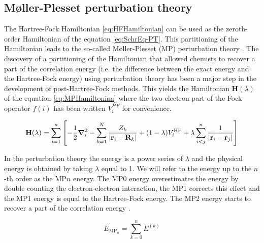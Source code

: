 \documentclass[11pt,a4paper]{article}
\newcommand{\bH}{\mathbf{H}}
\begin{document}
\subsection{M{\o}ller-Plesset perturbation theory}

The Hartree-Fock Hamiltonian \eqref{eq:HFHamiltonian} can be used as the zeroth-order Hamiltonian of the equation \eqref{eq:SchrEq-PT}. This partitioning of the Hamiltonian leads to the so-called M{\o}ller-Plesset (MP) perturbation theory \cite{Moller_1934}. The discovery of a partitioning of the Hamiltonian that allowed chemists to recover a part of the correlation energy (i.e. the difference between the exact energy and the Hartree-Fock energy) using perturbation theory has been a major step in the development of post-Hartree-Fock methods. This yields the Hamiltonian $\bH(\lambda)$ of the equation \eqref{eq:MPHamiltonian} where the two-electron part of the Fock operator $f(i)$ has been written $V_i^{HF}$ for convenience.

\begin{equation}\label{eq:MPHamiltonian}
    \bH(\lambda)=\sum\limits_{i=1}^{n}\left[-\frac{1}{2}\grad_i^2 - \sum\limits_{k=1}^{N} \frac{Z_k}{|\vb{r}_i-\vb{R}_k|} + (1-\lambda)V_i^{\text{HF}}+\lambda\sum\limits_{i<j}^{n}\frac{1}{|\vb{r}_i-\vb{r}_j|} \right]
\end{equation}

In the perturbation theory the energy is a power series of $\lambda$ and the physical energy is obtained by taking $\lambda$ equal to 1. We will refer to the energy up to the $n$-th order as the MP$n$ energy. The MP0 energy overestimates the energy by double counting the electron-electron interaction, the MP1 corrects this effect and the MP1 energy is equal to the Hartree-Fock energy. The MP2 energy starts to recover a part of the correlation energy \cite{SzaboBook}.

\begin{equation}
E_{\text{MP}_{n}}= \sum_{k=0}^n E^{(k)}
\end{equation}
\end{document}
